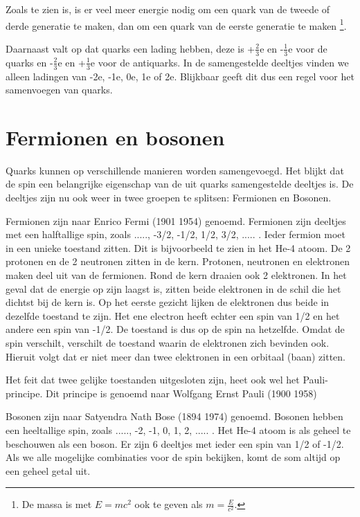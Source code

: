 Zoals te zien is, is er veel meer energie nodig om een quark van de
tweede of derde generatie te maken, dan om een quark van de eerste
generatie te maken \footnote{De massa is met $E=mc^{2}$ ook te geven als
$m=\frac{E}{c^{2}}$.}.

Daarnaast valt op dat quarks een lading hebben, deze is +$\frac{2}{3}$e
en -$\frac{1}{3}$e voor de quarks en -$\frac{2}{3}$e en +$\frac{1}{3}$e
voor de antiquarks. In de samengestelde deeltjes vinden we alleen
ladingen van -2e, -1e, 0e, 1e of 2e. Blijkbaar geeft dit dus een regel
voor het samenvoegen van quarks.


\section{Fermionen en bosonen}

Quarks kunnen op verschillende manieren worden samengevoegd. Het blijkt
dat de spin een belangrijke eigenschap van de uit quarks samengestelde
deeltjes is. De deeltjes zijn nu ook weer in twee groepen te splitsen:
Fermionen en Bosonen.

Fermionen zijn naar Enrico Fermi (1901 \textendash{} 1954) genoemd.
Fermionen zijn deeltjes met een halftallige spin, zoals ....., -3/2,
-1/2, 1/2, 3/2, ..... . Ieder fermion moet in een unieke toestand
zitten. Dit is bijvoorbeeld te zien in het He-4 atoom. De 2 protonen
en de 2 neutronen zitten in de kern. Protonen, neutronen en elektronen
maken deel uit van de fermionen. Rond de kern draaien ook 2 elektronen.
In het geval dat de energie op zijn laagst is, zitten beide elektronen
in de schil die het dichtst bij de kern is. Op het eerste gezicht
lijken de elektronen dus beide in dezelfde toestand te zijn. Het ene
electron heeft echter een spin van 1/2 en het andere een spin van
-1/2. De toestand is dus op de spin na hetzelfde. Omdat de spin verschilt,
verschilt de toestand waarin de elektronen zich bevinden ook. Hieruit
volgt dat er niet meer dan twee elektronen in een orbitaal (baan)
zitten.

Het feit dat twee gelijke toestanden uitgesloten zijn, heet ook wel
het Pauli-principe. Dit principe is genoemd naar Wolfgang Ernst Pauli
(1900 \textendash{} 1958)

Bosonen zijn naar Satyendra Nath Bose (1894 \textendash{} 1974) genoemd.
Bosonen hebben een heeltallige spin, zoals ....., -2, -1, 0, 1, 2,
..... . Het He-4 atoom is als geheel te beschouwen als een boson.
Er zijn 6 deeltjes met ieder een spin van 1/2 of -1/2. Als we alle
mogelijke combinaties voor de spin bekijken, komt de som altijd op
een geheel getal uit. 

